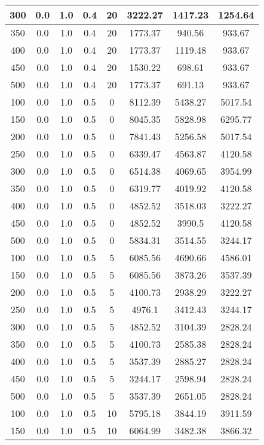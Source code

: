 \documentclass[a4paper, 12pt]{extreport}
\begin{document}
\begin{itemize}
\begin{longtable}{|c|c|c|c|c|c|c|c|}
			300 & 0.0 & 1.0 & 0.4 & 20 & 3222.27 & 1417.23 & 1254.64 \\\hline
			350 & 0.0 & 1.0 & 0.4 & 20 & 1773.37 & 940.56 & 933.67 \\\hline
			400 & 0.0 & 1.0 & 0.4 & 20 & 1773.37 & 1119.48 & 933.67 \\\hline
			450 & 0.0 & 1.0 & 0.4 & 20 & 1530.22 & 698.61 & 933.67 \\\hline
			500 & 0.0 & 1.0 & 0.4 & 20 & 1773.37 & 691.13 & 933.67 \\\hline
			100 & 0.0 & 1.0 & 0.5 & 0 & 8112.39 & 5438.27 & 5017.54 \\\hline
			150 & 0.0 & 1.0 & 0.5 & 0 & 8045.35 & 5828.98 & 6295.77 \\\hline
			200 & 0.0 & 1.0 & 0.5 & 0 & 7841.43 & 5256.58 & 5017.54 \\\hline
			250 & 0.0 & 1.0 & 0.5 & 0 & 6339.47 & 4563.87 & 4120.58 \\\hline
			300 & 0.0 & 1.0 & 0.5 & 0 & 6514.38 & 4069.65 & 3954.99 \\\hline
			350 & 0.0 & 1.0 & 0.5 & 0 & 6319.77 & 4019.92 & 4120.58 \\\hline
			400 & 0.0 & 1.0 & 0.5 & 0 & 4852.52 & 3518.03 & 3222.27 \\\hline
			450 & 0.0 & 1.0 & 0.5 & 0 & 4852.52 & 3990.5 & 4120.58 \\\hline
			500 & 0.0 & 1.0 & 0.5 & 0 & 5834.31 & 3514.55 & 3244.17 \\\hline
			100 & 0.0 & 1.0 & 0.5 & 5 & 6085.56 & 4690.66 & 4586.01 \\\hline
			150 & 0.0 & 1.0 & 0.5 & 5 & 6085.56 & 3873.26 & 3537.39 \\\hline
			200 & 0.0 & 1.0 & 0.5 & 5 & 4100.73 & 2938.29 & 3222.27 \\\hline
			250 & 0.0 & 1.0 & 0.5 & 5 & 4976.1 & 3412.43 & 3244.17 \\\hline
			300 & 0.0 & 1.0 & 0.5 & 5 & 4852.52 & 3104.39 & 2828.24 \\\hline
			350 & 0.0 & 1.0 & 0.5 & 5 & 4100.73 & 2585.38 & 2828.24 \\\hline
			400 & 0.0 & 1.0 & 0.5 & 5 & 3537.39 & 2885.27 & 2828.24 \\\hline
			450 & 0.0 & 1.0 & 0.5 & 5 & 3244.17 & 2598.94 & 2828.24 \\\hline
			500 & 0.0 & 1.0 & 0.5 & 5 & 3537.39 & 2651.05 & 2828.24 \\\hline
			100 & 0.0 & 1.0 & 0.5 & 10 & 5795.18 & 3844.19 & 3911.59 \\\hline
			150 & 0.0 & 1.0 & 0.5 & 10 & 6064.99 & 3482.38 & 3866.32 \\\hline

\end{longtable}
\end{itemize}
\end{document}
